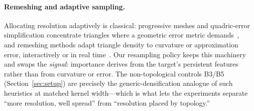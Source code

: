 \paragraph{Remeshing and adaptive sampling.}
Allocating resolution adaptively is classical: progressive meshes and
quadric-error simplification concentrate triangles where a geometric error
metric demands~\cite{hoppe1996progressive,garland1997qem}, and remeshing
methods adapt triangle density to curvature or approximation error,
interactively or in real time~\cite{alliez2003anisotropic,botsch2004remeshing,dunyach2013adaptive}.
Our resampling policy keeps this machinery and swaps the \emph{signal}:
importance derives from the target's persistent features rather than from
curvature or error. The non-topological controls B3/B5
(Section~\ref{sec:setup}) are precisely the generic-densification analogue of
such heuristics at matched kernel width---which is what lets the experiments
separate ``more resolution, well spread'' from ``resolution placed by
topology.''
